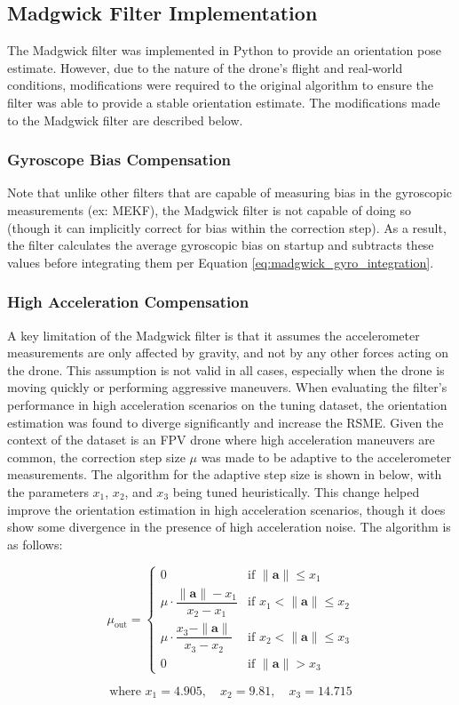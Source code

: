 \documentclass[bare_jrnl_transmag]{subfiles}
\begin{document}
\subsection{Madgwick Filter Implementation}
The Madgwick filter was implemented in Python to provide an orientation pose estimate. However, due to the nature of the drone's flight and real-world conditions, modifications were required to the original algorithm to ensure the filter was able to provide a stable orientation estimate. The modifications made to the Madgwick filter are described below.

\subsubsection{Gyroscope Bias Compensation}
Note that unlike other filters that are capable of measuring bias in the gyroscopic measurements (ex: MEKF), the Madgwick filter is not capable of doing so (though it can implicitly correct for bias within the correction step). As a result, the filter calculates the average gyroscopic bias on startup and subtracts these values before integrating them per Equation \ref{eq:madgwick_gyro_integration}.

\subsubsection{High Acceleration Compensation}
A key limitation of the Madgwick filter is that it assumes the accelerometer measurements are only affected by gravity, and not by any other forces acting on the drone. This assumption is not valid in all cases, especially when the drone is moving quickly or performing aggressive maneuvers. When evaluating the filter's performance in high acceleration scenarios on the tuning dataset, the orientation estimation was found to diverge significantly and increase the RSME. Given the context of the dataset is an FPV drone where high acceleration maneuvers are common, the correction step size $\mu$ was made to be adaptive to the accelerometer measurements. The algorithm for the adaptive step size is shown in below, with the parameters $x_1$, $x_2$, and $x_3$ being tuned heuristically. This change helped improve the orientation estimation in high acceleration scenarios, though it does show some divergence in the presence of high acceleration noise. The algorithm is as follows:

\[
\mu_{\text{out}} =
\begin{cases}
0 & \text{if } \|\mathbf{a}\| \leq x_1 \\
\mu \cdot \dfrac{\|\mathbf{a}\| - x_1}{x_2 - x_1} & \text{if } x_1 < \|\mathbf{a}\| \leq x_2 \\
\mu \cdot \dfrac{x_3 - \|\mathbf{a}\|}{x_3 - x_2} & \text{if } x_2 < \|\mathbf{a}\| \leq x_3 \\
0 & \text{if } \|\mathbf{a}\| > x_3
\end{cases}
\]

\[
\text{where } x_1 = 4.905, \quad x_2 = 9.81, \quad x_3 = 14.715
\]
\end{document}
